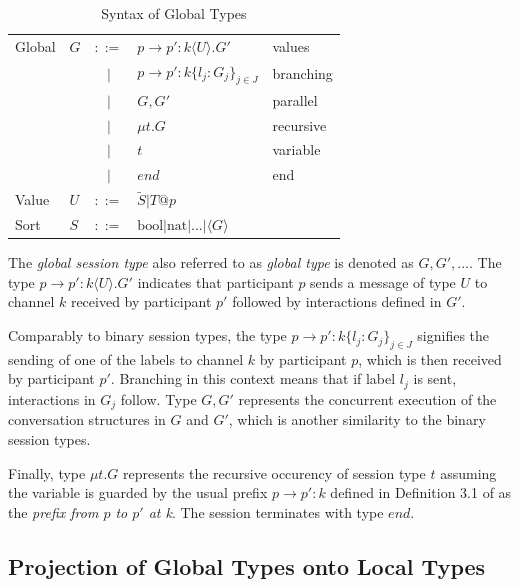 \begin{table}[H]
\center
\caption{Syntax of Global Types}
\begin{tabular}{|l|l c l|l|}
  \hline  
  Global &	$G$ &	$::=$	& $p \rightarrow p' : k \langle U \rangle . G'$ 					& 	values	 	\\
  		 &		&	$|$		& $p \rightarrow p' : k \lbrace l_{j}:G_{j} \rbrace _{j \in J} $ 	& 	branching 	\\
  		 &		&	$|$		& $G,G' $ 															& 	parallel 	\\
  		 &		&	$|$		& $\mu t.G $ 														& 	recursive 	\\
  		 &		&	$|$		& $t$ 																& 	variable 	\\
  		 &		&	$|$		& $end$ 															& 	end		 	\\
  Value	 &	$U$ &	$::=$	& $\tilde{S} | T@p $							 					& 			 	\\
  Sort	 &	$S$ &	$::=$	& $ \text{bool} | \text{nat} | \text{...} | \langle G \rangle $		& 			 	\\	  
  \hline
\end{tabular}
\label{TBglobtypesynt}
\end{table}

The \textit{global session type} also referred to as \textit{global type} is denoted as $G,G',...$. The type  $p \rightarrow p' : k \langle U \rangle . G'$ indicates that participant $p$ sends a message of type $U$ to channel $k$ received by participant $p'$ followed by interactions defined in $G'$. 

Comparably to binary session types, the type $p \rightarrow p' : k \lbrace l_{j}:G_{j} \rbrace _{j \in J} $ signifies the sending of one of the labels to channel $k$ by participant $p$, which is then received by participant $p'$. Branching in this context means that if label $l_{j}$ is sent, interactions in $G_{j}$ follow.
Type $G, G'$ represents the concurrent execution of the conversation structures in $G$ and $G'$, which is another similarity to the binary session types.

Finally, type $\mu t.G $ represents the recursive occurency of session type $t$ assuming the variable is guarded by the usual prefix $p \rightarrow p' : k $ defined in Definition 3.1 of \cite{multiparty_sess_types} as the \textit{prefix from $p$ to $p'$ at k}. The session terminates with type $end$.

\subsection{Projection of Global Types onto Local Types}

